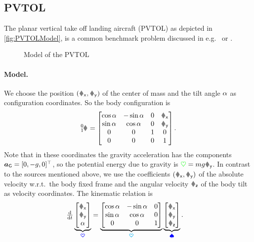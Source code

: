 \subsection{PVTOL}
The planar vertical take off landing aircraft (PVTOL) as depicted in \autoref{fig:PVTOLModel}, is a common benchmark problem discussed in e.g.\ \cite{Hauser:PVTOL} or \cite{Fliess:LieBacklund}.
\begin{figure}
 \centering
 
 \caption{Model of the PVTOL}
 \label{fig:PVTOLModel}
\end{figure}

\paragraph{Model.}
We choose the position $(\rx, \ry)$ of the center of mass and the tilt angle $\alpha$ as configuration coordinates.
So the body configuration is
\begin{align}
 \bodyHomoCoord{0}{1} = \begin{bmatrix} \cos\tiltAngle & -\sin\tiltAngle & 0 & \rx \\ \sin\tiltAngle & \cos\tiltAngle & 0 & \ry \\ 0 & 0 & 1 & 0 \\ 0 & 0 & 0 & 1 \end{bmatrix}.
\end{align}
Note that in these coordinates the gravity acceleration has the components $\boldsymbol{a}_{\mathsf{G}} = [0,-g,0]^\top$, so the potential energy due to gravity is $\potentialEnergy = \m \gravityAccConst \ry$.
In contrast to the sources mentioned above, we use the coefficients $(\vx, \vy)$ of the absolute velocity w.r.t.\ the body fixed frame and the angular velocity $\wz$ of the body tilt as velocity coordinates.
The kinematic relation is 
\begin{align}
 \ddt
 \underbrace{\begin{bmatrix} \rx \\ \ry \\ \tiltAngle \end{bmatrix}}_{\sysCoord}
 &= 
 \underbrace{\begin{bmatrix} \cos\tiltAngle & -\sin\tiltAngle & 0 \\ \sin\tiltAngle & \cos\tiltAngle & 0 \\ 0 & 0 & 1 \end{bmatrix}}_{\kinMat}
 \underbrace{\begin{bmatrix} \vx \\ \vy \\ \wz \end{bmatrix}}_{\sysVel}.
\end{align}
